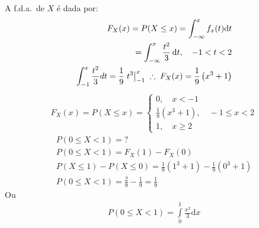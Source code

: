 \begin{description}
\begin{example}
           A f.d.a.\ de $X$ é dada por: 
           \begin{align*}
             F_{X}(x)= P(X \le x)= \int_{-\infty}^{x} f_{x}(t) \mathrm{d}t\\
             = \int_{-\infty}^{x} \frac{t^2}{3} \, \mathrm{d}t , \quad -1<t<2 \\
             \int_{-1}^{x} \frac{t^2}{3} dt= \frac{1}{9} \left.t^3\right\rvert_{-1}^{x} \; \therefore \; F_{X}(x)= \frac{1}{9}\left(x^3 +1\right)
           \end{align*}
           \begin{align*}
             F_{X}(x)=P(X \le x)= 
             \begin{cases}
               0, \quad x <-1 \\
               \frac{1}{9}(x^3 +1) , \quad -1 \le x <2 \\
               1, \quad x \geq 2
             \end{cases}
           \end{align*}
           \begin{align*}
             P(0 \le X <1)=? \\
             P(0 \le X <1)= {F}_{X}(1)- {F}_{X}(0)\\
             P(X \le 1 ) - P(X \le 0)= \frac{1}{9} (1^3 + 1 ) - \frac{1}{9}(0^3+ 1)\\
             P(0 \le X < 1 )= \frac{2}{9} - \frac{1}{9} = \frac{1}{9}
           \end{align*}
           Ou 
           \begin{align*}
             P(0 \leq X < 1) = \int \limits_{0}^{1} \frac{x^2 }{3}\mathrm{d}x 
           \end{align*}
       \end{example}
   \end{description}
